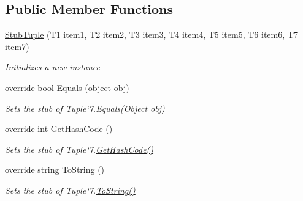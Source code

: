 \subsection*{Public Member Functions}
\begin{DoxyCompactItemize}
\item 
\hyperlink{class_system_1_1_fakes_1_1_stub_tuple_3_01_t1_00_01_t2_00_01_t3_00_01_t4_00_01_t5_00_01_t6_00_01_t7_01_4_a119bba750123c904881a7f9cd586a927}{Stub\-Tuple} (T1 item1, T2 item2, T3 item3, T4 item4, T5 item5, T6 item6, T7 item7)
\begin{DoxyCompactList}\small\item\em Initializes a new instance\end{DoxyCompactList}\item 
override bool \hyperlink{class_system_1_1_fakes_1_1_stub_tuple_3_01_t1_00_01_t2_00_01_t3_00_01_t4_00_01_t5_00_01_t6_00_01_t7_01_4_aebbcfda38ca24b0f498ccd590defbf1d}{Equals} (object obj)
\begin{DoxyCompactList}\small\item\em Sets the stub of Tuple`7.Equals(\-Object obj)\end{DoxyCompactList}\item 
override int \hyperlink{class_system_1_1_fakes_1_1_stub_tuple_3_01_t1_00_01_t2_00_01_t3_00_01_t4_00_01_t5_00_01_t6_00_01_t7_01_4_ac862abf0f649471d158b3beb00cfe7d1}{Get\-Hash\-Code} ()
\begin{DoxyCompactList}\small\item\em Sets the stub of Tuple`7.\hyperlink{class_system_1_1_fakes_1_1_stub_tuple_3_01_t1_00_01_t2_00_01_t3_00_01_t4_00_01_t5_00_01_t6_00_01_t7_01_4_ac862abf0f649471d158b3beb00cfe7d1}{Get\-Hash\-Code()}\end{DoxyCompactList}\item 
override string \hyperlink{class_system_1_1_fakes_1_1_stub_tuple_3_01_t1_00_01_t2_00_01_t3_00_01_t4_00_01_t5_00_01_t6_00_01_t7_01_4_a249de5c8b927c986e45eec7cefb7c9e3}{To\-String} ()
\begin{DoxyCompactList}\small\item\em Sets the stub of Tuple`7.\hyperlink{class_system_1_1_fakes_1_1_stub_tuple_3_01_t1_00_01_t2_00_01_t3_00_01_t4_00_01_t5_00_01_t6_00_01_t7_01_4_a249de5c8b927c986e45eec7cefb7c9e3}{To\-String()}\end{DoxyCompactList}\end{DoxyCompactItemize}
